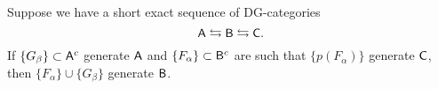 \documentclass{amsart}
\begin{document}
\begin{exer}
	Suppose we have a short exact sequence of DG-categories
	\[
		\mathsf{A} \leftrightarrows \mathsf{B} \leftrightarrows \mathsf{C}.
	\]
	If $\{ G_\beta \} \subset \mathsf{A}^c$ generate $\mathsf{A}$ and $\{ F_\alpha \} \subset \mathsf{B}^c$ are such that $\{ p(F_\alpha) \}$ generate $\mathsf{C}$, then $\{ F_\alpha \} \cup \{ G_\beta \}$ generate $\mathsf{B}$.
\end{exer}
\end{document}
